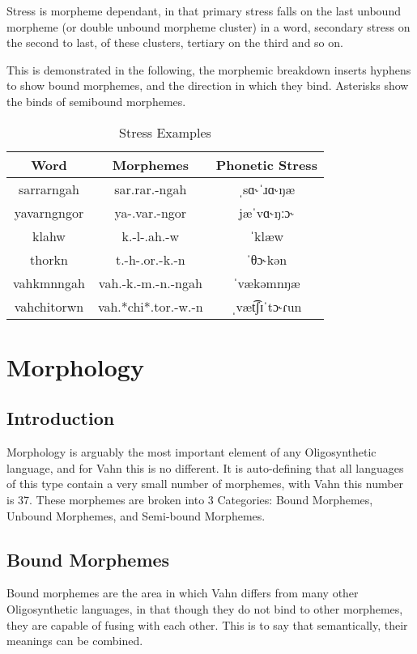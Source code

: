 \documentclass{article}
\begin{document}
Stress is morpheme dependant, in that primary stress falls on the last unbound morpheme (or double unbound morpheme cluster) in a word, secondary stress on the second to last, of these clusters, tertiary on the third and so on.

This is demonstrated in the following, the morphemic breakdown inserts hyphens to show bound morphemes, and the direction in which they bind. Asterisks show the binds of semibound morphemes.

\begin{table}[H]
\centering
\begin{tabular}{c|c|c}
 Word & Morphemes & Phonetic Stress \\
 \hline
  sarrarngah & sar.rar.-ngah & ˌsɑ˞ˈɹɑ˞ŋæ  \\
  yavarngngor & ya-.var.-ngor & jæˈvɑ˞ŋːɔ˞ \\
  klahw & k.-l-.ah.-w & ˈklæw \\
  thorkn & t.-h-.or.-k.-n & ˈθɔ˞kən \\
  vahkmnngah & vah.-k.-m.-n.-ngah & ˈvækəmnŋæ \\
  vahchitorwn & vah.*chi*.tor.-w.-n & ˌvæt͡ʃɪˈtɔ˞ɾun
\end{tabular}
\caption{Stress Examples}
\label{Stress Examples}
\end{table}

\newpage

\section{Morphology}

\subsection{Introduction}

Morphology is arguably the most important element of any Oligosynthetic language, and for Vahn this is no different. It is auto-defining that all languages of this type contain a very small number of morphemes, with Vahn this number is 37. These morphemes are broken into 3 Categories: Bound Morphemes, Unbound Morphemes, and Semi-bound Morphemes.

\subsection{Bound Morphemes}

Bound morphemes are the area in which Vahn differs from many other Oligosynthetic languages, in that though they do not bind to other morphemes, they are capable of fusing with each other. This is to say that semantically, their meanings can be combined.
\end{document}
